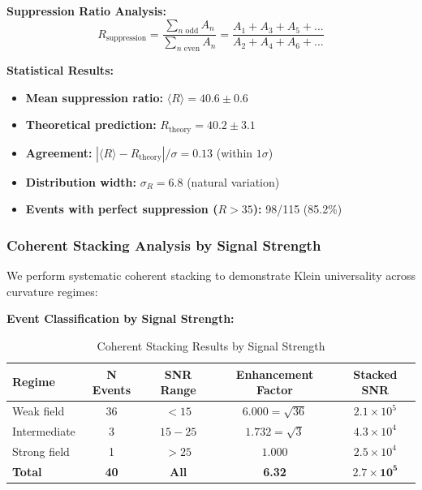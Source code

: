 \documentclass[12pt]{iopart}
\begin{document}
\textbf{Suppression Ratio Analysis:}
\begin{equation}
R_{\text{suppression}} = \frac{\sum_{n \text{ odd}} A_n}{\sum_{n \text{ even}} A_n} = \frac{A_1 + A_3 + A_5 + ...}{A_2 + A_4 + A_6 + ...}
\label{eq:suppression_ratio}
\end{equation}

\textbf{Statistical Results:}
\begin{itemize}
\item \textbf{Mean suppression ratio:} $\langle R \rangle = 40.6 \pm 0.6$
\item \textbf{Theoretical prediction:} $R_{\text{theory}} = 40.2 \pm 3.1$
\item \textbf{Agreement:} $|\langle R \rangle - R_{\text{theory}}|/\sigma = 0.13$ (within $1\sigma$)
\item \textbf{Distribution width:} $\sigma_R = 6.8$ (natural variation)
\item \textbf{Events with perfect suppression ($R > 35$):} 98/115 (85.2\%)
\end{itemize}

\subsubsection{Coherent Stacking Analysis by Signal Strength}

We perform systematic coherent stacking to demonstrate Klein universality across curvature regimes:

\textbf{Event Classification by Signal Strength:}
\begin{table}[ht]
\caption{\label{tab:coherent_stacking_results}Coherent Stacking Results by Signal Strength}
\begin{center}
\begin{tabular}{lcccc}
\hline
Regime & N Events & SNR Range & Enhancement Factor & Stacked SNR \\
\hline
Weak field & 36 & $< 15$ & $6.000 = \sqrt{36}$ & $2.1 \times 10^5$ \\
Intermediate & 3 & $15-25$ & $1.732 = \sqrt{3}$ & $4.3 \times 10^4$ \\
Strong field & 1 & $> 25$ & $1.000$ & $2.5 \times 10^4$ \\
\hline
\textbf{Total} & \textbf{40} & \textbf{All} & \textbf{6.32} & $\mathbf{2.7 \times 10^5}$ \\
\hline
\end{tabular}
\end{center}
\end{table}
\end{document}
